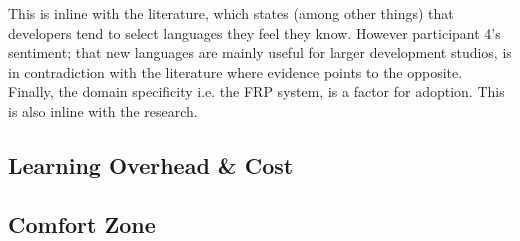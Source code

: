 This is inline with the literature, which states (among other things) that developers tend to select languages they feel they know\cite{meyerovich2013empirical}. However participant 4's sentiment; that new languages are mainly useful for larger development studios, is in contradiction with the literature where evidence points to the opposite. Finally, the domain specificity i.e. the \gls{FRP} system, is a factor for adoption. This is also inline with the research. 

\subsection{Learning Overhead \& Cost}


\subsection{Comfort Zone}
